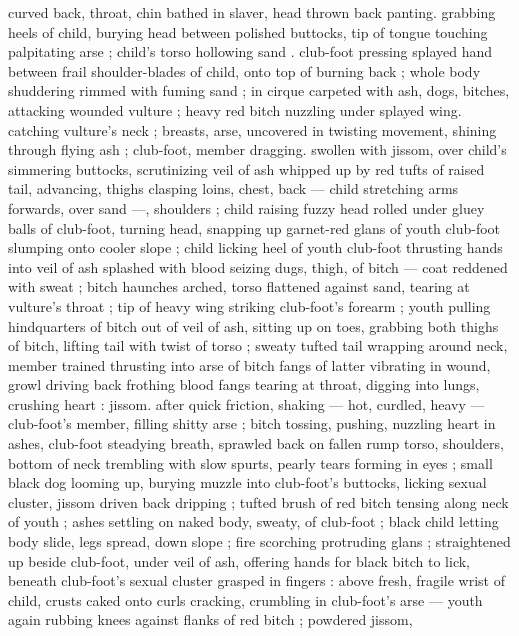 {curved back, throat, chin bathed in slaver, head thrown back panting. 
grabbing heels of child, burying head between polished buttocks, tip 
of tongue touching palpitating arse ; child's torso hollowing sand . 
club-foot pressing splayed hand between frail shoulder-blades of 
child, onto top of burning back ; whole body shuddering rimmed with 
fuming sand ; in cirque carpeted with ash, dogs, bitches, attacking 
wounded vulture ; heavy red bitch nuzzling under splayed wing. 
catching vulture's neck ; breasts, arse, uncovered in twisting 
movement, shining through flying ash ; club-foot, member dragging. 
swollen with jissom, over child's simmering buttocks, scrutinizing veil 
of ash whipped up by red tufts of raised tail, advancing, thighs 
clasping loins, chest, back --- child stretching arms forwards, over 
sand ---, shoulders ; child raising fuzzy head rolled under gluey balls 
of club-foot, turning head, snapping up garnet-red glans of youth 
club-foot slumping onto cooler slope ; child licking heel of youth 
club-foot thrusting hands into veil of ash splashed with blood 
seizing dugs, thigh, of bitch --- coat reddened with sweat ; bitch 
haunches arched, torso flattened against sand, tearing at vulture's 
throat ; tip of heavy wing striking club-foot's forearm ; youth pulling 
hindquarters of bitch out of veil of ash, sitting up on toes, grabbing 
both thighs of bitch, lifting tail with twist of torso ; sweaty tufted tail 
wrapping around neck, member trained thrusting into arse of bitch 
fangs of latter vibrating in wound, growl driving back frothing blood 
fangs tearing at throat, digging into lungs, crushing heart : jissom. 
after quick friction, shaking --- hot, curdled, heavy --- club-foot's 
member, filling shitty arse ; bitch tossing, pushing, nuzzling heart in 
ashes, club-foot steadying breath, sprawled back on fallen rump 
torso, shoulders, bottom of neck trembling with slow spurts, pearly 
tears forming in eyes ; small black dog looming up, burying muzzle 
into club-foot's buttocks, licking sexual cluster, jissom driven back 
dripping ; tufted brush of red bitch tensing along neck of youth ; 
ashes settling on naked body, sweaty, of club-foot ; black child 
letting body slide, legs spread, down slope ; fire scorching 
protruding glans ; straightened up beside club-foot, under veil of 
ash, offering hands for black bitch to lick, beneath club-foot's sexual 
cluster grasped in fingers : above fresh, fragile wrist of child, crusts 
caked onto curls cracking, crumbling in club-foot's arse --- youth 
again rubbing knees against flanks of red bitch ; powdered jissom, 
}
